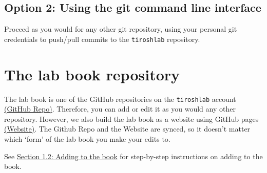 \documentclass[
]{book}
\begin{document}
\hypertarget{option-2-using-the-git-command-line-interface}{%
\subsection{Option 2: Using the git command line interface}\label{option-2-using-the-git-command-line-interface}}

Proceed as you would for any other git repository, using your personal git credentials to push/pull commits to the \texttt{tiroshlab} repository.

\hypertarget{the-lab-book-repository}{%
\section{The lab book repository}\label{the-lab-book-repository}}

The lab book is one of the GitHub repositories on the \texttt{tiroshlab} account \href{https://github.com/tiroshlab/lab-book}{(GitHub Repo)}. Therefore, you can add or edit it as you would any other repository. However, we also build the lab book as a website using GitHub pages \href{https://tiroshlab.github.io/lab-book/}{(Website)}. The Github Repo and the Website are synced, so it doesn't matter which `form' of the lab book you make your edits to.

See \href{https://tiroshlab.github.io/lab-book/index.html\#adding-to-the-book}{Section 1.2: Adding to the book} for step-by-step instructions on adding to the book.

  
\end{document}
